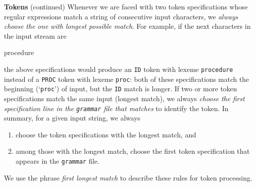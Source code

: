 \begin{minipage}[t]{\sw}
\slidenumber
\LARGE
{\bf Tokens} (continued)\exx
Whenever we are faced with two token specifications
whose regular expressions match a string of consecutive input characters,
we {\em always choose the one with longest possible match}.
For example, if the next characters in the input stream are
\begin{qv}
procedure
\end{qv}
the above specifications would produce an \verb'ID' token
with lexeme \verb'procedure' instead of a \verb'PROC' token
with lexeme \verb'proc':
both of these specifications match the beginning (`\verb'proc'') of input,
but the \verb'ID' match is longer.\exx
If two or more token specifications
match the same input (longest match), we always
{\em choose the first specification line
in the \verb'grammar' file that matches} to identify the token.\exx
In summary, for a given input string, we always
\begin{enumerate}
\item choose the token specifications with the longest match, and
\item among those with the longest match, 
      choose the first token specification 
      that appears in the \verb'grammar' file.
\end{enumerate}
We use the phrase {\em first longest match}
to describe these rules for token processing.
\end{minipage}
\clearpage
